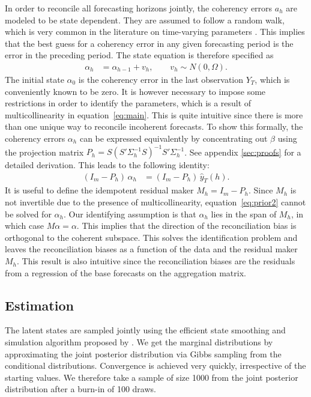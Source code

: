 \documentclass[a4paper,fleqn,11pt]{article}
\begin{document}
In order to reconcile all forecasting horizons jointly, the coherency errors $a_h$ are modeled to be state dependent. They are assumed to follow a random walk, which is very common in the literature on time-varying parameters \citep[see for instance][and references therein]{Primiceri2005}. This implies that the best guess for a coherency error in any given forecasting period is the error in the preceding period. The state equation is therefore specified as
\begin{align}
	\label{eq:state}
	\alpha_h & = \alpha_{h-1} + v_h, \qquad v_h \sim N(0, \Omega).
\end{align}
The initial state $\alpha_0$ is the coherency error in the last observation $Y_{T}$, which is conveniently known to be zero. It is however necessary to impose some restrictions in order to identify the parameters, which is a result of multicollinearity in equation~\eqref{eq:main}. This is quite intuitive since there is more than one unique way to reconcile incoherent forecasts. To show this formally, the coherency errors $\alpha_h$ can be expressed equivalently by concentrating out $\beta$ using the projection matrix $P_h = S(S'\Sigma_h^{-1} S)^{-1}S'\Sigma_h^{-1}$. See appendix \ref{sec:proofs} for a detailed derivation. This leads to the following identity:
\begin{align}
	\label{eq:prior2}
	(I_m - P_h)\, \alpha_h &= (I_m - P_h)\, \hat{y}_T(h).
\end{align}
It is useful to define the idempotent residual maker $M_h = I_m - P_h$. Since $M_h$ is not invertible due to the presence of multicollinearity, equation~\eqref{eq:prior2} cannot be solved for $\alpha_h$. Our identifying assumption is that $\alpha_h$ lies in the span of $M_h$, in which case $M\alpha = \alpha$. This implies that the direction of the reconciliation bias is orthogonal to the coherent subspace. This solves the identification problem and leaves the reconciliation biases as a function of the data and the residual maker $M_h$. This result is also intuitive since the reconciliation biases are the residuals from a regression of the base forecasts on the aggregation matrix.


\subsection{Estimation}\label{sec:estim}
The latent states are sampled jointly using the efficient state smoothing and simulation algorithm proposed by \cite{Chan2009}. We get the marginal distributions by approximating the joint posterior distribution via Gibbs sampling from the conditional distributions. Convergence is achieved very quickly, irrespective of the starting values. We therefore take a sample of size 1000 from the joint posterior distribution after a burn-in of 100 draws.
\end{document}
